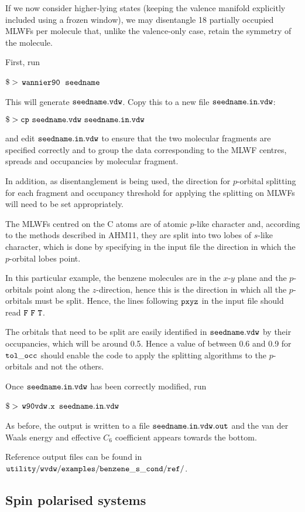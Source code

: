 \documentclass{report}
\newcommand{\wvdw}{{$\tt{w90vdw}$}}
\newcommand{\wannier}{{$\tt{wannier90}$}}
\begin{document}
If we now consider higher-lying states (keeping the valence manifold
explicitly included using a frozen window), we may disentangle 18
partially occupied MLWFs per molecule that, unlike the valence-only
case, retain the symmetry of the molecule.

First, run

$\tt{\$>}$ \wannier\ $\tt{seedname}$

This will generate $\tt{seedname.vdw}$. Copy this to a new file
$\tt{seedname.in.vdw}$:

$\tt{\$> cp\ seedname.vdw\ seedname.in.vdw}$

and edit $\tt{seedname.in.vdw}$ to ensure that the two molecular
fragments are specified correctly and to group the data corresponding
to the MLWF centres, spreads and occupancies by molecular fragment.

In addition, as disentanglement is being used, the direction for
$p$-orbital splitting for each fragment and occupancy threshold for
applying the splitting on MLWFs will need to be set appropriately.

The MLWFs centred on the C atoms are of atomic $p$-like character and,
according to the methods described in AHM11, they are split into two
lobes of $s$-like character, which is done by specifying in the input file
the direction in which the $p$-orbital lobes point.

In this particular example, the benzene molecules are in
the $x$-$y$ plane and the $p$-orbitals point along the $z$-direction,
hence this is the direction in which all the $p$-orbitals must be
split. Hence, the lines following $\tt{pxyz}$ in the input file
should read $\tt{F\ F\ T}$.

The orbitals that need to be split are easily identified in
$\tt{seedname.vdw}$ by their occupancies, which will be around
0.5. Hence a value of between 0.6 and 0.9 for $\tt{tol\_occ}$ should
enable the code to apply the splitting algorithms to the $p$-orbitals
and not the others.

Once $\tt{seedname.in.vdw}$ has been correctly modified, run

$\tt{\$>}$ \wvdw$\tt{.x}$ $\tt{seedname.in.vdw}$

As before, the output is written to a file $\tt{seedname.in.vdw.out}$
and the van der Waals energy and effective $C_6$ coefficient appears
towards the bottom.

Reference output files can be found in
$\tt{utility/wvdw/examples/benzene\_s\_cond/ref/}$.


\subsection{Spin polarised systems}
\end{document}

